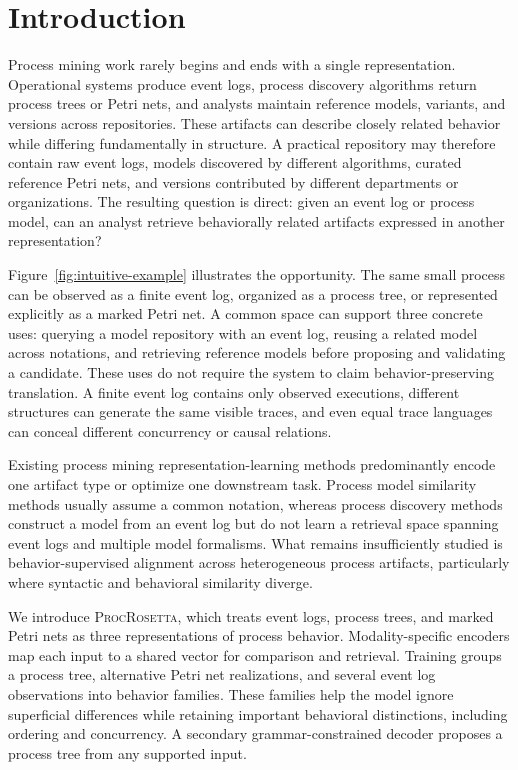 \documentclass[mathematics,article,submit,moreauthors]{Definitions/mdpi}
\newcommand{\model}{\textsc{ProcRosetta}\xspace}
\begin{document}
\section{Introduction}\label{sec:introduction}

Process mining work rarely begins and ends with a single representation. Operational systems produce event logs, process discovery algorithms return process trees or Petri nets, and analysts maintain reference models, variants, and versions across repositories. These artifacts can describe closely related behavior while differing fundamentally in structure. A practical repository may therefore contain raw event logs, models discovered by different algorithms, curated reference Petri nets, and versions contributed by different departments or organizations. The resulting question is direct: given an event log or process model, can an analyst retrieve behaviorally related artifacts expressed in another representation?

Figure~\ref{fig:intuitive-example} illustrates the opportunity. The same small process can be observed as a finite event log, organized as a process tree, or represented explicitly as a marked Petri net. A common space can support three concrete uses: querying a model repository with an event log, reusing a related model across notations, and retrieving reference models before proposing and validating a candidate. These uses do not require the system to claim behavior-preserving translation. A finite event log contains only observed executions, different structures can generate the same visible traces, and even equal trace languages can conceal different concurrency or causal relations.



Existing process mining representation-learning methods predominantly encode one artifact type or optimize one downstream task. Process model similarity methods usually assume a common notation, whereas process discovery methods construct a model from an event log but do not learn a retrieval space spanning event logs and multiple model formalisms. What remains insufficiently studied is behavior-supervised alignment across heterogeneous process artifacts, particularly where syntactic and behavioral similarity diverge.

We introduce \model, which treats event logs, process trees, and marked Petri nets as three representations of process behavior. Modality-specific encoders map each input to a shared vector for comparison and retrieval. Training groups a process tree, alternative Petri net realizations, and several event log observations into behavior families. These families help the model ignore superficial differences while retaining important behavioral distinctions, including ordering and concurrency. A secondary grammar-constrained decoder proposes a process tree from any supported input.
\end{document}
